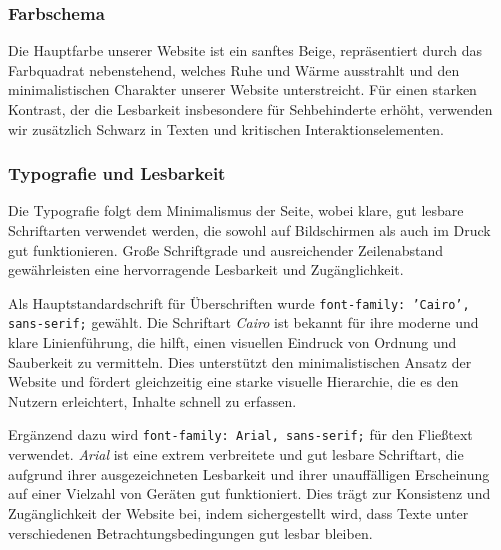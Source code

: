 \subsubsection{Farbschema}
Die Hauptfarbe unserer Website ist ein sanftes Beige, repräsentiert durch das Farbquadrat nebenstehend, welches Ruhe und Wärme ausstrahlt und den minimalistischen Charakter unserer Website unterstreicht. Für einen starken Kontrast, der die Lesbarkeit insbesondere für Sehbehinderte erhöht, verwenden wir zusätzlich Schwarz in Texten und kritischen Interaktionselementen.

\noindent{} \quad {}

\subsubsection{Typografie und Lesbarkeit}
Die Typografie folgt dem Minimalismus der Seite, wobei klare, gut lesbare Schriftarten verwendet werden, die sowohl auf Bildschirmen als auch im Druck gut funktionieren. Große Schriftgrade und ausreichender Zeilenabstand gewährleisten eine hervorragende Lesbarkeit und Zugänglichkeit.

Als Hauptstandardschrift für Überschriften wurde \texttt{font-family: 'Cairo', sans-serif;} gewählt. Die Schriftart \textit{Cairo} ist bekannt für ihre moderne und klare Linienführung, die hilft, einen visuellen Eindruck von Ordnung und Sauberkeit zu vermitteln. Dies unterstützt den minimalistischen Ansatz der Website und fördert gleichzeitig eine starke visuelle Hierarchie, die es den Nutzern erleichtert, Inhalte schnell zu erfassen.

Ergänzend dazu wird \texttt{font-family: Arial, sans-serif;} für den Fließtext verwendet. \textit{Arial} ist eine extrem verbreitete und gut lesbare Schriftart, die aufgrund ihrer ausgezeichneten Lesbarkeit und ihrer unauffälligen Erscheinung auf einer Vielzahl von Geräten gut funktioniert. Dies trägt zur Konsistenz und Zugänglichkeit der Website bei, indem sichergestellt wird, dass Texte unter verschiedenen Betrachtungsbedingungen gut lesbar bleiben.

